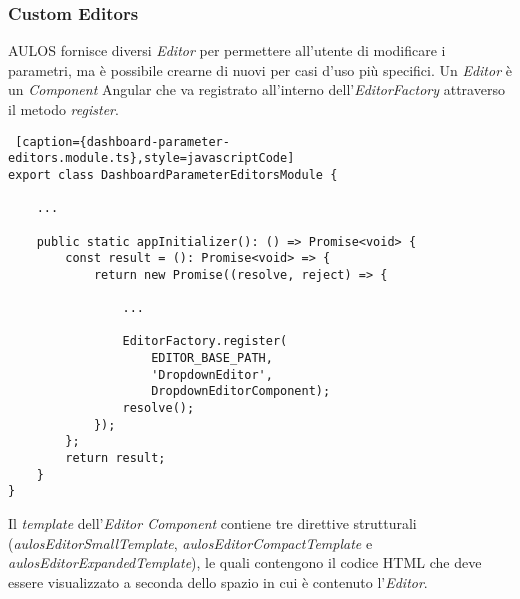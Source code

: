 \subsubsection{Custom Editors}
AULOS fornisce diversi \textit{Editor} per permettere all'utente di modificare i parametri, ma è possibile crearne di nuovi per casi d'uso più specifici. Un \textit{Editor} è un \textit{Component} Angular che va registrato all'interno dell'\textit{EditorFactory} attraverso il metodo \textit{register}.\\
\begin{lstlisting} [caption={dashboard-parameter-editors.module.ts},style=javascriptCode]
export class DashboardParameterEditorsModule {

    ...

    public static appInitializer(): () => Promise<void> {
        const result = (): Promise<void> => {
            return new Promise((resolve, reject) => {
            
                ...
                
                EditorFactory.register(
                    EDITOR_BASE_PATH,
                    'DropdownEditor',
                    DropdownEditorComponent);
                resolve();
            });
        };
        return result;
    }
}
\end{lstlisting}
Il \textit{template} dell'\textit{Editor Component} contiene tre direttive strutturali (\textit{aulosEditorSmallTemplate}, \textit{aulosEditorCompactTemplate} e \textit{aulosEditorExpandedTemplate}), le quali contengono il codice HTML che deve essere visualizzato a seconda dello spazio in cui è contenuto l'\textit{Editor}.
